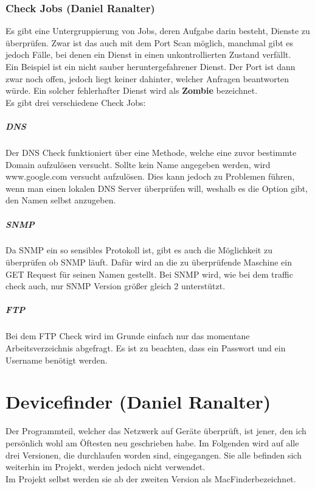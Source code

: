 \documentclass[12pt,a4paper]{report}
\begin{document}
\begin{onehalfspace}
\subsection{Check Jobs (Daniel Ranalter)}
Es gibt eine Untergruppierung von Jobs, deren Aufgabe darin besteht, Dienste zu überprüfen. Zwar ist das auch mit dem Port Scan möglich, manchmal gibt es jedoch Fälle, bei denen ein Dienst in einen unkontrollierten Zustand verfällt.\\
Ein Beispiel ist ein nicht sauber heruntergefahrener Dienst. Der Port ist dann zwar noch offen, jedoch liegt keiner dahinter, welcher Anfragen beantworten würde. Ein solcher fehlerhafter Dienst wird als \textbf{Zombie} bezeichnet.\\

Es gibt drei verschiedene Check Jobs:\\
\paragraph{DNS}
Der DNS Check funktioniert über eine Methode, welche eine zuvor bestimmte Domain aufzulösen versucht. Sollte kein Name angegeben werden, wird www.google.com versucht aufzulösen. Dies kann jedoch zu Problemen führen, wenn man einen lokalen DNS Server überprüfen will, weshalb es die Option gibt, den Namen selbst anzugeben.

\paragraph{SNMP}
Da SNMP ein so sensibles Protokoll ist, gibt es auch die Möglichkeit zu überprüfen ob SNMP läuft. Dafür wird an die zu überprüfende Maschine ein GET Request für seinen Namen gestellt. Bei SNMP wird, wie bei dem traffic check auch, nur SNMP Version größer gleich 2 unterstützt.

\paragraph{FTP}
Bei dem FTP Check wird im Grunde einfach nur das momentane Arbeitsverzeichnis abgefragt. Es ist zu beachten, dass ein Passwort und ein Username benötigt werden. 


\chapter{Devicefinder (Daniel Ranalter)}
Der Programmteil, welcher das Netzwerk auf Geräte überprüft, ist jener, den ich persönlich wohl am Öftesten neu geschrieben habe. Im Folgenden wird auf alle drei Versionen, die durchlaufen worden sind, eingegangen. Sie alle befinden sich weiterhin im Projekt, werden jedoch nicht verwendet.\\
Im Projekt selbst werden sie ab der zweiten Version als \glqq MacFinder\grqq bezeichnet. 

\end{onehalfspace}
\end{document}
